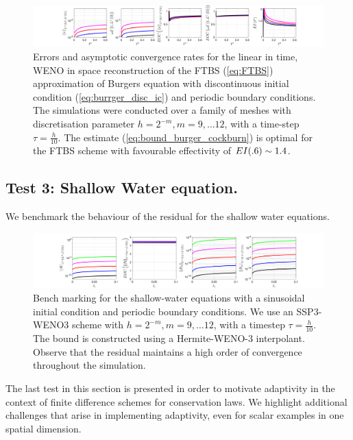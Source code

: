 \documentclass[final]{amsart}
\numberwithin{equation}{section}
\begin{document}
\begin{figure}[H] 
	\includegraphics[width=\textwidth]{../figures/fig_FTBS_bound_comparison_burgers_offset_0_rarefaction_simpleinterp}	
	\caption{
		\label{fig:FTBS_burger_step}
		Errors and asymptotic convergence rates for the linear in time,
		WENO in space reconstruction of the FTBS (\ref{eq:FTBS})
		approximation of Burgers equation with discontinuous initial condition
		(\ref{eq:burrger_disc_ic}) and periodic boundary conditions. The simulations were conducted over a family of
		meshes with discretisation parameter $h = 2^{-m}, m = 9,\dots 12$,
		with a time-step $\tau = \tfrac{h}{10}$. The estimate (\ref{eq:bound_burger_cockburn})
		is  optimal for the FTBS scheme with favourable effectivity of
		$EI \!\left({.6}\right) \sim 1.4$.}
\end{figure}



\subsection{Test 3:  Shallow Water equation.  }  We benchmark the behaviour of the residual for the shallow water equations.
\begin{figure}[H]	
	\includegraphics[width=\textwidth]{../figures/fig_SHW_RK3_WENO3_rec3_fixed_gsplots_1x5_sin_IC_P3_shw}	
	\caption{\label{fig:SSP3WENO_SHW} Bench marking for the shallow-water equations with a sinusoidal initial condition and periodic boundary conditions. We use an SSP3-WENO3 scheme with $h = 2^{-m}, m = 9,\dots 12$,
		with a timestep $\tau = \tfrac{h}{10}$.  The bound is constructed using a Hermite-WENO-3 interpolant.  Observe that the residual maintains a high order of convergence throughout the simulation.}
\end{figure}

The last test in this section is presented in order to motivate adaptivity in the context of finite difference schemes for conservation laws. We highlight additional challenges that arise in implementing adaptivity, even for scalar examples in one spatial dimension.  
\end{document}

